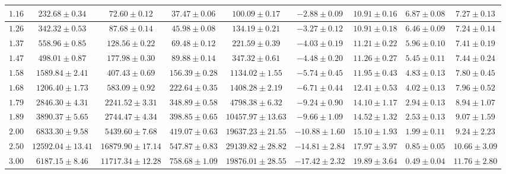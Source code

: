 \begin{sidewaystable}[t!]
\begin{tabular}{|c|c|c|c|c|c|c|c|c|}
            \hline
            $1.16$ & $232.68 \pm 0.34$ & $72.60 \pm 0.12$ & $37.47 \pm 0.06$ & $100.09 \pm 0.17$ & $-2.88 \pm 0.09$ & $10.91 \pm 0.16$ & $6.87 \pm 0.08$ & $7.27 \pm 0.13$ \\
            \hline
            $1.26$ & $342.32 \pm 0.53$ & $87.68 \pm 0.14$ & $45.98 \pm 0.08$ & $134.19 \pm 0.21$ & $-3.27 \pm 0.12$ & $10.91 \pm 0.18$ & $6.46 \pm 0.09$ & $7.24 \pm 0.14$ \\
            \hline
            $1.37$ & $558.96 \pm 0.85$ & $128.56 \pm 0.22$ & $69.48 \pm 0.12$ & $221.59 \pm 0.39$ & $-4.03 \pm 0.19$ & $11.21 \pm 0.22$ & $5.96 \pm 0.10$ & $7.41 \pm 0.19$ \\
            \hline
            $1.47$ & $498.01 \pm 0.87$ & $177.98 \pm 0.30$ & $89.88 \pm 0.14$ & $347.32 \pm 0.61$ & $-4.48 \pm 0.20$ & $11.26 \pm 0.27$ & $5.45 \pm 0.11$ & $7.44 \pm 0.24$ \\
            \hline
            $1.58$ & $1589.84 \pm 2.41$ & $407.43 \pm 0.69$ & $156.39 \pm 0.28$ & $1134.02 \pm 1.55$ & $-5.74 \pm 0.45$ & $11.95 \pm 0.43$ & $4.83 \pm 0.13$ & $7.80 \pm 0.45$ \\
            \hline
            $1.68$ & $1206.40 \pm 1.73$ & $583.09 \pm 0.92$ & $222.64 \pm 0.35$ & $1408.28 \pm 2.19$ & $-6.71 \pm 0.44$ & $12.41 \pm 0.53$ & $4.02 \pm 0.13$ & $7.96 \pm 0.52$ \\
            \hline
            $1.79$ & $2846.30 \pm 4.31$ & $2241.52 \pm 3.31$ & $348.89 \pm 0.58$ & $4798.38 \pm 6.32$ & $-9.24 \pm 0.90$ & $14.10 \pm 1.17$ & $2.94 \pm 0.13$ & $8.94 \pm 1.07$ \\
            \hline
            $1.89$ & $3890.37 \pm 5.65$ & $2744.47 \pm 4.34$ & $398.85 \pm 0.65$ & $10457.97 \pm 13.63$ & $-9.66 \pm 1.09$ & $14.52 \pm 1.32$ & $2.53 \pm 0.13$ & $9.07 \pm 1.59$ \\
            \hline
            $2.00$ & $6833.30 \pm 9.58$ & $5439.60 \pm 7.68$ & $419.07 \pm 0.63$ & $19637.23 \pm 21.55$ & $-10.88 \pm 1.60$ & $15.10 \pm 1.93$ & $1.99 \pm 0.11$ & $9.24 \pm 2.23$ \\
            \hline
            $2.50$ & $12592.04 \pm 13.41$ & $16879.90 \pm 17.14$ & $547.87 \pm 0.83$ & $29139.82 \pm 28.82$ & $-14.81 \pm 2.84$ & $17.97 \pm 3.97$ & $0.85 \pm 0.05$ & $10.66 \pm 3.09$ \\
            \hline
            $3.00$ & $6187.15 \pm 8.46$ & $11717.34 \pm 12.28$ & $758.68 \pm 1.09$ & $19876.01 \pm 28.55$ & $-17.42 \pm 2.32$ & $19.89 \pm 3.64$ & $0.49 \pm 0.04$ & $11.76 \pm 2.80$ \\

\end{tabular}
\end{sidewaystable}
